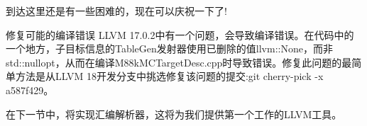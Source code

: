 到达这里还是有一些困难的，现在可以庆祝一下了!

\begin{myTip}{修复可能的编译错误}
LLVM 17.0.2中有一个问题，会导致编译错误。在代码中的一个地方，子目标信息的TableGen发射器使用已删除的值llvm::None，而非std::nullopt，从而在编译M88kMCTargetDesc.cpp时导致错误。修复此问题的最简单方法是从LLVM 18开发分支中挑选修复该问题的提交:git cherry-pick -x a587f429。
\end{myTip}

在下一节中，将实现汇编解析器，这将为我们提供第一个工作的LLVM工具。



















































